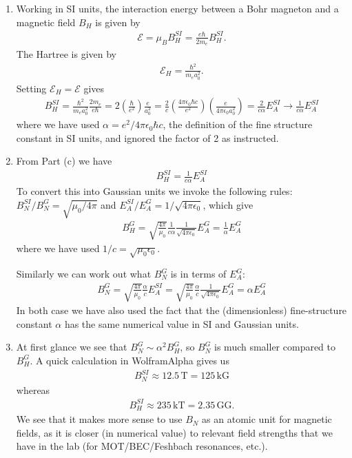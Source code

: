 \documentclass{article}
\theoremstyle{definition}
\newcommand{\al}{\alpha}
\newcommand{\f}[2]{\frac{#1}{#2}}
\newcommand{\lp}{\left(}
\newcommand{\rp}{\right)}
\begin{document}
\begin{enumerate}[label=\alph*)]
	
	
	\item Working in SI units, the interaction energy between a Bohr magneton and a magnetic field $B_H$ is given by 
	\begin{align*}
	\mathcal{E} = \mu_B B^{SI}_H = \f{e \hbar}{2 m_e} B_H^{SI}.
	\end{align*}
	The Hartree is given by 
	\begin{align*}
	\mathcal{E}_H = \f{\hbar^2}{m_e a_0^2}.
	\end{align*}
	Setting $\mathcal{E}_H = \mathcal{E}$ gives
	\begin{align*}
	B_H^{SI} = \f{\hbar^2}{m_ea_0^2} \f{2m_e}{e\hbar} = 2\lp \f{\hbar}{e^2} \rp \f{e}{a_0^2} = \f{2}{c}\lp \f{4\pi \epsilon_0 \hbar c}{e^2} \rp \lp \f{e}{4\pi \epsilon_0 a_0^2} \rp = \f{2}{c\al} E_A^{SI} \to \boxed{\f{1}{c\al} E_A^{SI}}
	\end{align*} 
	where we have used $\al = e^2/4\pi \epsilon_0 \hbar c$, the definition of the fine structure constant in SI units, and ignored the factor of 2 as instructed. 
	
	
	\item From Part (c) we have
	\begin{align*}
	B_H^{SI} =  \f{1}{c\al} E_A^{SI} 
	\end{align*}
	To convert this into Gaussian units we invoke the following rules: $B^{SI}_N/B^G_N = \sqrt{\mu_0/4\pi}$ and $E_A^{SI}/E^G_A = 1/\sqrt{4\pi\epsilon_0}$, which give
	\begin{align*}
	\boxed{B_H^{G}} = \sqrt{\f{4\pi}{\mu_0}} \f{1}{c\al} \f{1}{\sqrt{4\pi \epsilon_0}} E_A^{G} = \boxed{\f{1}{\al} E_A^G}
	\end{align*}
	where we have used $1/c = \sqrt{\mu_0 \epsilon_0}$.
	
	
	Similarly we can work out what $B_N^{G}$ is in terms of $E_A^{G}$:
	\begin{align*}
	\boxed{B^G_{N}}= \sqrt{\f{4\pi}{\mu_0}} \f{\al}{c}E_A^{SI} = \sqrt{\f{4\pi}{\mu_0}} \f{\al}{c} \f{1}{\sqrt{4\pi \epsilon_0}} E_A^G = \boxed{\al E_A^G}
	\end{align*}
	In both case we have also used the fact that the (dimensionless) fine-structure constant $\al$ has the same numerical value in SI and Gaussian units.
	
	
	
	\item At first glance we see that $B_N^G \sim \al^2 B_H^G$, so $B_N^G$ is much smaller compared to $B_H^G$. A quick calculation in WolframAlpha gives us 
	\begin{align*}
	B_N^{SI} \approx 12.5\, \text{T} = 125 \, \text{kG}
	\end{align*}
	whereas 
	\begin{align*}
	B_H^{SI} \approx 235 \, \text{kT} = 2.35 \, \text{GG}.
	\end{align*}
	We see that it makes more sense to use $B_N$ as an atomic unit for magnetic fields, as it is closer (in numerical value) to relevant field strengths that we have in the lab (for MOT/BEC/Feshbach resonances, etc.).
\end{enumerate}
\end{document}
